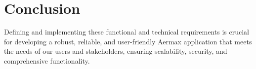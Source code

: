 \setcounter{secnumdepth}{0}
\section{Conclusion}
Defining and implementing these functional and technical requirements is crucial for developing a robust, reliable, and user-friendly Aermax application that meets the needs of our users and stakeholders, ensuring scalability, security, and comprehensive functionality.